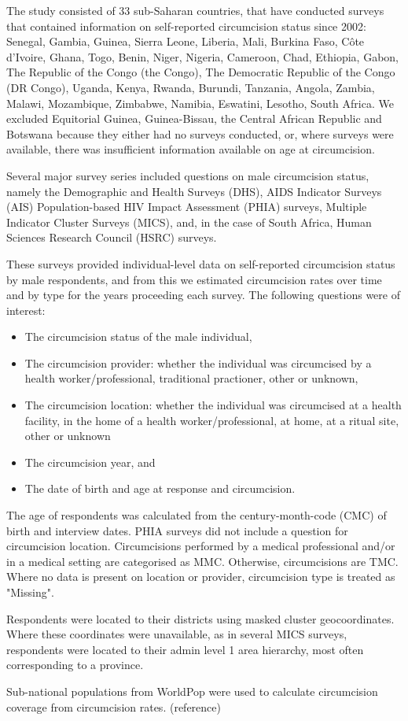 \documentclass{article}
\begin{document}

The study consisted of 33 sub-Saharan countries, that have conducted surveys that contained information on self-reported circumcision status since 2002: Senegal, Gambia, Guinea, Sierra Leone, Liberia, Mali, Burkina Faso, Côte d’Ivoire, Ghana, Togo, Benin, Niger, Nigeria, Cameroon, Chad, Ethiopia, Gabon, The Republic of the Congo (the Congo), The Democratic Republic of the Congo (DR Congo), Uganda, Kenya, Rwanda, Burundi, Tanzania, Angola, Zambia, Malawi, Mozambique, Zimbabwe, Namibia, Eswatini, Lesotho, South Africa. 
We excluded Equitorial Guinea, Guinea-Bissau, the Central African Republic and Botswana because they either had no surveys conducted, or, where surveys were available, there was insufficient information available on age at circumcision.

{\color{red} Several major survey series included questions on male circumcision status, namely the Demographic and Health Surveys (DHS), AIDS Indicator Surveys (AIS) Population-based HIV Impact Assessment (PHIA) surveys, Multiple Indicator Cluster Surveys (MICS), and, in the case of South Africa, Human Sciences Research Council (HSRC) surveys.

These surveys provided individual-level data on self-reported circumcision status by male respondents, and from this we estimated circumcision rates over time and by type for the years proceeding each survey. The following questions were of interest:
\begin{itemize}
\item The circumcision status of the male individual,
\item The circumcision provider: whether the individual was circumcised by a health worker/professional, traditional practioner, other or unknown,
\item The circumcision location: whether the individual was circumcised at a health facility, in the home of a health worker/professional, at home, at a ritual site, other or unknown
\item The circumcision year, and
\item The date of birth and age at response and circumcision.
\end{itemize}

The age of respondents was calculated from the century-month-code (CMC) of birth and interview dates.
PHIA surveys did not include a question for circumcision location. Circumcisions performed by a medical professional and/or in a medical setting are categorised as MMC. Otherwise, circumcisions are TMC. Where no data is present on location or provider, circumcision type is treated as "Missing". 

Respondents were located to their districts using masked cluster geocoordinates. Where these coordinates were unavailable, as in several MICS surveys, respondents were located to their admin level 1 area hierarchy, most often corresponding to a province. 

Sub-national populations from WorldPop were used to calculate circumcision coverage from circumcision rates. (reference)}
\end{document}
